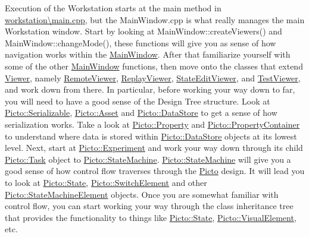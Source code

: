 Execution of the Workstation starts at the main method in \hyperlink{workstation_2main_8cpp}{workstation\textbackslash{}main.\-cpp}, but the Main\-Window.\-cpp is what really manages the main Workstation window. Start by looking at Main\-Window\-::create\-Viewers() and Main\-Window\-::change\-Mode(), these functions will give you as sense of how navigation works within the \hyperlink{class_main_window}{Main\-Window}. After that familiarize yourself with some of the other \hyperlink{class_main_window}{Main\-Window} functions, then move onto the classes that extend \hyperlink{class_viewer}{Viewer}, namely \hyperlink{class_remote_viewer}{Remote\-Viewer}, \hyperlink{class_replay_viewer}{Replay\-Viewer}, \hyperlink{class_state_edit_viewer}{State\-Edit\-Viewer}, and \hyperlink{class_test_viewer}{Test\-Viewer}, and work down from there. In particular, before working your way down to far, you will need to have a good sense of the Design Tree structure. Look at \hyperlink{class_picto_1_1_serializable}{Picto\-::\-Serializable}, \hyperlink{class_picto_1_1_asset}{Picto\-::\-Asset} and \hyperlink{class_picto_1_1_data_store}{Picto\-::\-Data\-Store} to get a sense of how serialization works. Take a look at \hyperlink{class_picto_1_1_property}{Picto\-::\-Property} and \hyperlink{class_picto_1_1_property_container}{Picto\-::\-Property\-Container} to understand where data is stored within \hyperlink{class_picto_1_1_data_store}{Picto\-::\-Data\-Store} objects at its lowest level. Next, start at \hyperlink{class_picto_1_1_experiment}{Picto\-::\-Experiment} and work your way down through its child \hyperlink{class_picto_1_1_task}{Picto\-::\-Task} object to \hyperlink{class_picto_1_1_state_machine}{Picto\-::\-State\-Machine}. \hyperlink{class_picto_1_1_state_machine}{Picto\-::\-State\-Machine} will give you a good sense of how control flow traverses through the \hyperlink{namespace_picto}{Picto} design. It will lead you to look at \hyperlink{class_picto_1_1_state}{Picto\-::\-State}, \hyperlink{class_picto_1_1_switch_element}{Picto\-::\-Switch\-Element} and other \hyperlink{class_picto_1_1_state_machine_element}{Picto\-::\-State\-Machine\-Element} objects. Once you are somewhat familiar with control flow, you can start working your way through the class inheritance tree that provides the functionality to things like \hyperlink{class_picto_1_1_state}{Picto\-::\-State}, \hyperlink{struct_picto_1_1_visual_element}{Picto\-::\-Visual\-Element}, etc.

